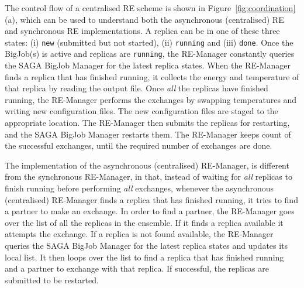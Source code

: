 \documentclass{rspublic}
\newcommand{\alnote}[1]{ {\textcolor{blue} { ***andre: #1 }}}
\newcommand{\alnote}[1]{}
\begin{document}


The control flow of a centralised RE scheme is shown in
Figure~\ref{fig:coordination}(a), which can be used to understand both
the asynchronous (centralised) RE and synchronous RE implementations.
A replica can be in one of these three states: (i) \texttt{new} (submitted but not started), (ii) \texttt{running} and (iii) \texttt{done}.
Once the BigJob(s) is active and replicas are \texttt{running}, the RE-Manager constantly
queries the SAGA BigJob Manager for the latest replica states.  When
the RE-Manager finds a replica that has finished running, it collects
the energy and temperature of that replica by reading the output
file. Once \emph{all} the replicas have finished running, the
RE-Manager performs the exchanges by swapping temperatures and writing
new configuration files. The new configuration files are staged to the
appropriate location. The RE-Manager then submits the replicas for
restarting, and the SAGA BigJob Manager restarts them. The RE-Manager
keeps count of the successful exchanges, until the required number of
exchanges are done.

The implementation of the asynchronous (centralised) RE-Manager, is
different from the synchronous RE-Manager, in that, instead of waiting
for \emph{all} replicas to finish running before performing \emph{all}
exchanges, whenever the asynchronous (centralised) RE-Manager finds a
replica that has finished running, it tries to find a partner to make
an exchange. In order to find a partner, the RE-Manager goes over the
list of all the replicas in the ensemble. If it finds a replica
available it attempts the exchange. If a replica is not found
available, the RE-Manager queries the SAGA BigJob Manager for the
latest replica states and updates its local list. It then loops over
the list to find a replica that has finished running and a partner to
exchange with that replica.  If successful, the replicas are submitted
to be restarted. %
\end{document}
